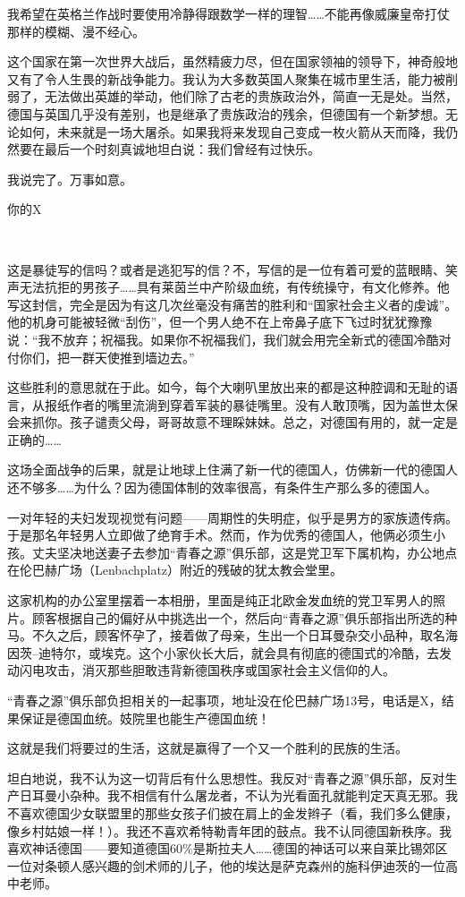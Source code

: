 \documentclass[UTF8]{ctexart}
\begin{document}
我希望在英格兰作战时要使用冷静得跟数学一样的理智……不能再像威廉皇帝打仗那样的模糊、漫不经心。

这个国家在第一次世界大战后，虽然精疲力尽，但在国家领袖的领导下，神奇般地又有了令人生畏的新战争能力。我认为大多数英国人聚集在城市里生活，能力被削弱了，无法做出英雄的举动，他们除了古老的贵族政治外，简直一无是处。当然，德国与英国几乎没有差别，也是继承了贵族政治的残余，但德国有一个新梦想。无论如何，未来就是一场大屠杀。如果我将来发现自己变成一枚火箭从天而降，我仍然要在最后一个时刻真诚地坦白说：我们曾经有过快乐。

我说完了。万事如意。

你的X

\ 

这是暴徒写的信吗？或者是逃犯写的信？不，写信的是一位有着可爱的蓝眼睛、笑声无法抗拒的男孩子……具有莱茵兰中产阶级血统，有传统操守，有文化修养。他写这封信，完全是因为有这几次丝毫没有痛苦的胜利和“国家社会主义者的虔诚”。他的机身可能被轻微“刮伤”，但一个男人绝不在上帝鼻子底下飞过时犹犹豫豫说：“我不放弃；祝福我。如果你不祝福我们，我们就会用完全新式的德国冷酷对付你们，把一群天使推到墙边去。”

这些胜利的意思就在于此。如今，每个大喇叭里放出来的都是这种腔调和无耻的语言，从报纸作者的嘴里流淌到穿着军装的暴徒嘴里。没有人敢顶嘴，因为盖世太保会来抓你。孩子谴责父母，哥哥故意不理睬妹妹。总之，对德国有用的，就一定是正确的……

这场全面战争的后果，就是让地球上住满了新一代的德国人，仿佛新一代的德国人还不够多……为什么？因为德国体制的效率很高，有条件生产那么多的德国人。

一对年轻的夫妇发现视觉有问题——周期性的失明症，似乎是男方的家族遗传病。于是那名年轻男人立即做了绝育手术。然而，作为优秀的德国人，他俩必须生小孩。丈夫坚决地送妻子去参加“青春之源”俱乐部，这是党卫军下属机构，办公地点在伦巴赫广场（Lenbachplatz）附近的残破的犹太教会堂里。

这家机构的办公室里摆着一本相册，里面是纯正北欧金发血统的党卫军男人的照片。顾客根据自己的偏好从中挑选出一个，然后向“青春之源”俱乐部指出所选的种马。不久之后，顾客怀孕了，接着做了母亲，生出一个日耳曼杂交小品种，取名海因茨–迪特尔，或埃克。这个小家伙长大后，就会具有彻底的德国式的冷酷，去发动闪电攻击，消灭那些胆敢违背新德国秩序或国家社会主义信仰的人。

“青春之源”俱乐部负担相关的一起事项，地址没在伦巴赫广场13号，电话是X，结果保证是德国血统。妓院里也能生产德国血统！

这就是我们将要过的生活，这就是赢得了一个又一个胜利的民族的生活。

坦白地说，我不认为这一切背后有什么思想性。我反对“青春之源”俱乐部，反对生产日耳曼小杂种。我不相信有什么屠龙者，不认为光看面孔就能判定天真无邪。我不喜欢德国少女联盟里的那些女孩子们披在肩上的金发辫子（看，我们多么健康，像乡村姑娘一样！）。我还不喜欢希特勒青年团的鼓点。我不认同德国新秩序。我喜欢神话德国——要知道德国60\%是斯拉夫人……德国的神话可以来自莱比锡郊区一位对条顿人感兴趣的剑术师的儿子，他的埃达是萨克森州的施科伊迪茨的一位高中老师。
\end{document}
